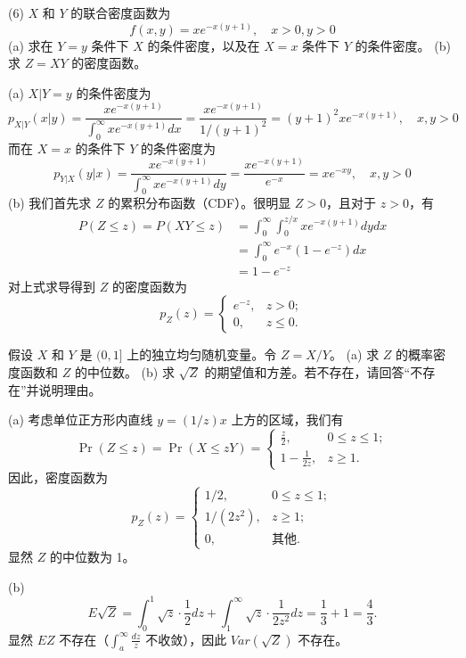 \begin{questions}
\question (6) $X$ 和 $Y$ 的联合密度函数为
\[
f(x, y) = xe^{-x(y+1)}, \quad x > 0, y > 0
\]
(a) 求在 $Y = y$ 条件下 $X$ 的条件密度，以及在 $X = x$ 条件下 $Y$ 的条件密度。
(b) 求 $Z = XY$ 的密度函数。

\begin{solution}
(a) $X|Y = y$ 的条件密度为
\[
p_{X|Y}(x|y) = \frac{xe^{-x(y+1)}}{\int_{0}^{\infty} xe^{-x(y+1)} dx} = \frac{xe^{-x(y+1)}}{1/(y+1)^2} = (y + 1)^2 xe^{-x(y+1)}, \quad x, y > 0
\]
而在 $X = x$ 的条件下 $Y$ 的条件密度为
\[
p_{Y|X}(y|x) = \frac{xe^{-x(y+1)}}{\int_{0}^{\infty} xe^{-x(y+1)} dy} = \frac{xe^{-x(y+1)}}{e^{-x}} = xe^{-xy}, \quad x, y > 0
\]
(b) 我们首先求 $Z$ 的累积分布函数（CDF）。很明显 $Z > 0$，且对于 $z > 0$，有
\begin{align*}
P(Z \le z) = P(XY \le z) &= \int_{0}^{\infty} \int_{0}^{z/x} xe^{-x(y+1)} dy dx \\
&= \int_{0}^{\infty} e^{-x}(1 - e^{-z}) dx \\
&= 1 - e^{-z}
\end{align*}
对上式求导得到 $Z$ 的密度函数为
\[
p_Z(z) = \begin{cases} e^{-z}, & z > 0; \\ 0, & z \le 0. \end{cases}
\]
\end{solution}

\question
假设 $X$ 和 $Y$ 是 $(0, 1]$ 上的独立均匀随机变量。令 $Z = X/Y$。
(a) 求 $Z$ 的概率密度函数和 $Z$ 的中位数。
(b) 求 $\sqrt{Z}$ 的期望值和方差。若不存在，请回答“不存在”并说明理由。

\begin{solution}
(a) 考虑单位正方形内直线 $y = (1/z)x$ 上方的区域，我们有
\[
\Pr(Z \le z) = \Pr(X \le zY) = \begin{cases} \frac{z}{2}, & 0 \le z \le 1; \\ 1 - \frac{1}{2z}, & z \ge 1. \end{cases}
\]
因此，密度函数为
\[
p_Z(z) = \begin{cases} 1/2, & 0 \le z \le 1; \\ 1/(2z^2), & z \ge 1; \\ 0, & \text{其他}. \end{cases}
\]
显然 $Z$ 的中位数为 1。

(b) 
\[
E\sqrt{Z} = \int_0^1 \sqrt{z} \cdot \frac{1}{2} dz + \int_1^{\infty} \sqrt{z} \cdot \frac{1}{2z^2} dz = \frac{1}{3} + 1 = \frac{4}{3}.
\]
显然 $EZ$ 不存在（$\int_a^{\infty} \frac{dz}{z}$ 不收敛），因此 $Var(\sqrt{Z})$ 不存在。
\end{solution}


\end{questions}
